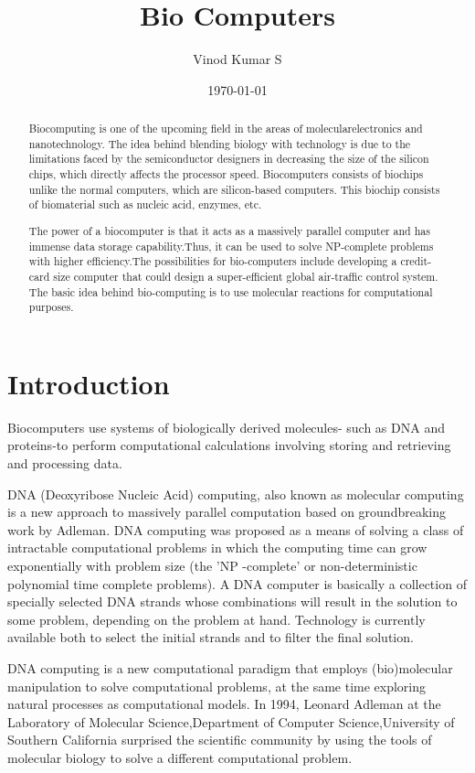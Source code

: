 \documentclass[a4paper]{article}
\title{Bio Computers}
\author{Vinod Kumar S}
\date{\today}
\begin{document}
\maketitle

\begin{abstract}
Biocomputing is one of the upcoming field in the areas of molecularelectronics and nanotechnology. The idea behind blending biology with technology is due to the limitations faced by the semiconductor designers in decreasing the size of the silicon chips, which directly affects the processor speed. Biocomputers consists of biochips unlike the normal computers, which are silicon-based computers. This biochip consists of biomaterial such as nucleic acid, enzymes, etc.

The power of a biocomputer is that it acts as a massively parallel computer and has immense data storage capability.Thus, it can be used to solve NP-complete problems with higher efficiency.The possibilities for bio-computers include developing a credit-card size computer that could design a super-efficient global air-traffic control system. The basic idea behind bio-computing is to use molecular reactions for computational purposes.
\end{abstract}

\section{Introduction}
\label{sec:introduction}

Biocomputers use systems of biologically derived molecules- such as DNA and proteins-to perform computational calculations involving storing and retrieving and processing data.

DNA  (Deoxyribose Nucleic  Acid)  computing,  also  known  as  molecular 
computing is a new approach to massively parallel computation based on 
groundbreaking  work  by  Adleman.  DNA  computing  was  proposed  as  a 
means of solving a class of intractable computational problems in which
the  computing  time  can  grow  exponentially  with  problem  size  (the  'NP
-complete' or non-deterministic polynomial time complete problems).
A  DNA  computer  is  basically  a  collection  of  specially  selected  DNA 
strands whose combinations will result in the solution to some problem, depending  on  the  problem  at  hand.  Technology  is  currently  available both  to  select  the  initial  strands  and  to  filter  the  final  solution.

DNA computing is a new computational paradigm that employs (bio)molecular 
manipulation   to   solve   computational   problems,   at   the   same   time exploring  natural  processes  as  computational  models.  In  1994, 
Leonard Adleman at the Laboratory of Molecular   Science,Department of Computer Science,University   of   Southern   California   surprised   the 
scientific  community  by  using  the  tools  of  molecular  biology  to  solve  a different computational problem. 
\end{document}
